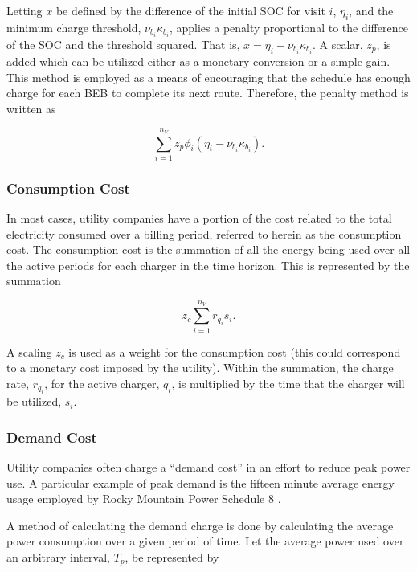 \documentclass[energies,article,submit,moreauthors]{Definitions/mdpi}
\begin{document}
Letting \(x\) be defined by the difference of the initial SOC for visit \(i\), \(\eta_i\), and the minimum charge threshold,
\(\nu_{b_i}\kappa_{b_i}\), applies a penalty proportional to the difference of the SOC and the threshold squared. That is, \(x =
\eta_i - \nu_{b_i} \kappa_{b_i}\). A scalar, \(z_p\), is added which can be utilized either as a monetary conversion or a simple
gain. This method is employed as a means of encouraging that the schedule has enough charge for each BEB to complete its
next route. Therefore, the penalty method is written as

\begin{equation}
\label{eq:penalty-method}
\sum_{i=1}^{n_V} z_p \phi_i(\eta_i - \nu_{b_i} \kappa_{b_i})\text{.}
\end{equation}

\subsubsection{Consumption Cost}
\label{sec:sa-consumpction-cost}
In most cases, utility companies have a portion of the cost related to the total electricity consumed over a billing
period, referred to herein as the consumption cost. The consumption cost is the summation of all the energy being used
over all the active periods for each charger in the time horizon. This is represented by the summation

\begin{equation}
\label{eq:consumption-cost}
z_c \sum_{i=1}^{n_V} r_{q_i}s_i\text{.}
\end{equation}

A scaling \(z_c\) is used as a weight for the consumption cost (this could correspond to a monetary cost imposed by the
utility). Within the summation, the charge rate, \(r_{q_i}\), for the active charger, \(q_i\), is multiplied by the time
that the charger will be utilized, \(s_i\).

\subsubsection{Demand Cost}
\label{sec:sa-demand-cost}
Utility companies often charge a ``demand cost'' in an effort to reduce peak power use. A particular example of peak
demand is the fifteen minute average energy usage employed by Rocky Mountain Power Schedule 8
\cite{rocky-mountain-power}.

A method of calculating the demand charge is done by calculating the average power consumption over a given period of
time. Let the average power used over an arbitrary interval, \(T_p\), be represented by
\end{document}
